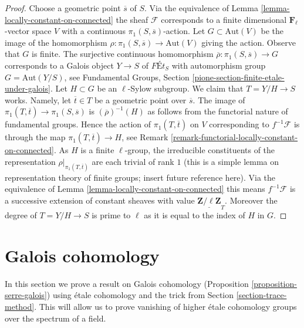 \begin{proof}
Choose a geometric point $\overline{s}$ of $S$.
Via the equivalence of Lemma \ref{lemma-locally-constant-on-connected}
the sheaf $\mathcal{F}$ corresponds to a finite dimensional
$\mathbf{F}_\ell$-vector space $V$ with a continuous
$\pi_1(S, \overline{s})$-action.
Let $G \subset \text{Aut}(V)$ be the image of the homomorphism
$\rho : \pi_1(S, \overline{s}) \to \text{Aut}(V)$ giving the action.
Observe that $G$ is finite.
The surjective continuous homomorphism
$\overline{\rho} : \pi_1(S, \overline{s}) \to G$
corresponds to a Galois object $Y \to S$ of
$\textit{F\'Et}_S$ with automorphism group $G = \text{Aut}(Y/S)$, see
Fundamental Groups, Section \ref{pione-section-finite-etale-under-galois}.
Let $H \subset G$ be an $\ell$-Sylow subgroup.
We claim that $T = Y/H \to S$ works. Namely, let $\overline{t} \in T$
be a geometric point over $\overline{s}$. The image of
$\pi_1(T, \overline{t}) \to \pi_1(S, \overline{s})$
is $(\overline{\rho})^{-1}(H)$ as follows from the functorial
nature of fundamental groups. Hence the action of $\pi_1(T, \overline{t})$
on $V$ corresponding to $f^{-1}\mathcal{F}$ is through
the map $\pi_1(T, \overline{t}) \to H$, see
Remark \ref{remark-functorial-locally-constant-on-connected}. As
$H$ is a finite $\ell$-group, the irreducible constituents of the
representation $\rho|_{\pi_1(T, \overline{t})}$
are each trivial of rank $1$ (this is a simple lemma on
representation theory of finite groups; insert future reference here).
Via the equivalence of
Lemma \ref{lemma-locally-constant-on-connected}
this means $f^{-1}\mathcal{F}$ is a successive extension of
constant sheaves with value $\underline{\mathbf{Z}/\ell\mathbf{Z}}_T$.
Moreover the degree of $T = Y/H \to S$ is prime to $\ell$
as it is equal to the index of $H$ in $G$.
\end{proof}






\section{Galois cohomology}
\label{section-galois-cohomology}

\noindent
In this section we prove a result on Galois cohomology
(Proposition \ref{proposition-serre-galois})
using \'etale cohomology and the trick from
Section \ref{section-trace-method}.
This will allow us to prove vanishing of higher \'etale cohomology groups
over the spectrum of a field.

